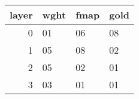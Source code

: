\begin{tabular}{rlll}
\toprule
 layer & wght & fmap & gold \\
\midrule
     0 &   01 &   06 &   08 \\
     1 &   05 &   08 &   02 \\
     2 &   05 &   02 &   01 \\
     3 &   03 &   01 &   01 \\
\bottomrule
\end{tabular}
